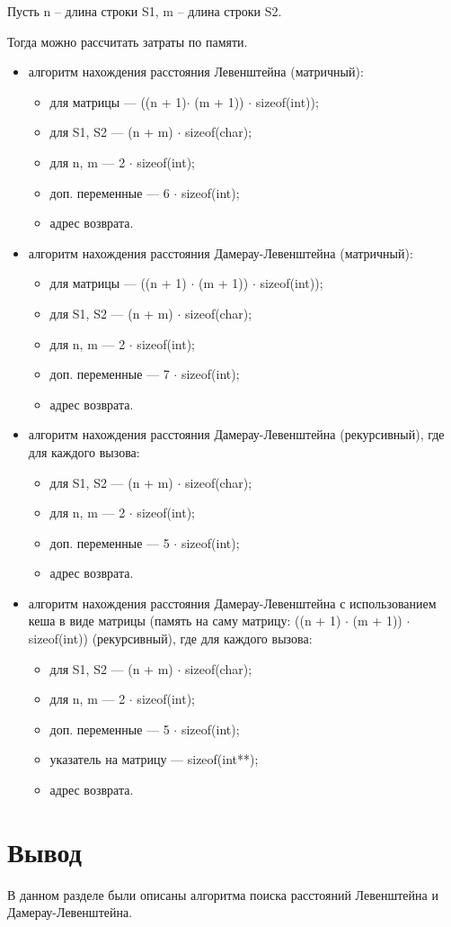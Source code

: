 Пусть n -- длина строки S1, m -- длина строки S2.

Тогда можно рассчитать затраты по памяти.
\begin{itemize}
	\item алгоритм нахождения расстояния Левенштейна (матричный):
	\begin{itemize}
		\item для матрицы --- ((n + 1)$ \cdot$ (m + 1)) $ \cdot$ sizeof(int));
		\item для S1, S2 --- (n + m) $ \cdot$ sizeof(char);
		\item для n, m --- 2 $ \cdot$ sizeof(int);
		\item доп. переменные --- 6 $ \cdot$ sizeof(int);
		\item адрес возврата.
	\end{itemize}
	
	\item алгоритм нахождения расстояния Дамерау-Левенштейна (матричный):
	\begin{itemize}
		\item для матрицы --- ((n + 1) $ \cdot$ (m + 1)) $ \cdot$ sizeof(int));
		\item для S1, S2 --- (n + m) $ \cdot$ sizeof(char);
		\item для n, m --- 2 $ \cdot$ sizeof(int);
		\item доп. переменные --- 7 $ \cdot$ sizeof(int);
		\item адрес возврата.
	\end{itemize}
	
	\item алгоритм нахождения расстояния Дамерау-Левенштейна (рекурсивный), где для каждого вызова:
	\begin{itemize}
		\item для S1, S2 --- (n + m) $ \cdot$ sizeof(char);
		\item для n, m --- 2 $ \cdot$ sizeof(int);
		\item доп. переменные --- 5 $ \cdot$ sizeof(int);
		\item адрес возврата.
	\end{itemize}
	
	\item алгоритм нахождения расстояния Дамерау-Левенштейна с использованием кеша в виде матрицы (память на саму матрицу: ((n + 1) $ \cdot$ (m + 1)) $ \cdot$ sizeof(int)) (рекурсивный), где для каждого вызова:
	\begin{itemize}
		\item для S1, S2 --- (n + m) $ \cdot$ sizeof(char);
		\item для n, m --- 2 $ \cdot$ sizeof(int);
		\item доп. переменные --- 5 $ \cdot$ sizeof(int);
		\item указатель на матрицу --- sizeof(int**);
		\item адрес возврата.
	\end{itemize}
	
\end{itemize}



\section*{Вывод}
В данном разделе были описаны алгоритма поиска расстояний Левенштейна и Дамерау-Левенштейна.